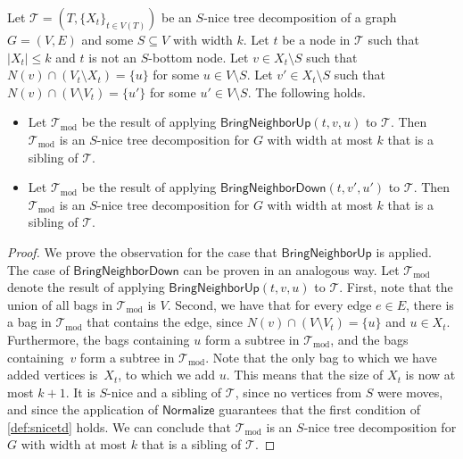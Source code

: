 \documentclass[a4paper,UKenglish,cleveref, autoref, thm-restate, numberwithinsect]{lipics-v2021}
\newcommand{\Normalize}{\mathsf{Normalize}}
\newcommand{\BringNeighborUp}{\mathsf{BringNeighborUp}}
\newcommand{\BringNeighborDown}{\mathsf{BringNeighborDown}}
\begin{document}
 \begin{observation} \label{lem:bringupdown}
     Let $\mathcal{T}=(T,\{X_t\}_{t\in V(T)})$ be an $S$-nice tree decomposition of a graph $G=(V,E)$ and some $S\subseteq V$ with width $k$. Let $t$ be a node in $\mathcal{T}$ such that $|X_t|\le k$ and $t$ is not an $S$-bottom node. Let $v\in X_t\setminus S$ such that $N(v)\cap (V_t\setminus X_t)=\{u\}$ for some $u\in V\setminus S$.
     Let $v'\in X_t\setminus S$ such that $N(v)\cap (V\setminus V_t)=\{u'\}$ for some $u'\in V\setminus S$. The following holds.
     \begin{itemize}
     \item Let $\mathcal{T}_{\text{mod}}$ be the result of applying $\BringNeighborUp(t, v, u)$ to $\mathcal{T}$. Then $\mathcal{T}_{\text{mod}}$ is an $S$-nice tree decomposition for $G$ with width at most $k$ that is a sibling of $\mathcal{T}$.
     \item Let $\mathcal{T}_{\text{mod}}$ be the result of applying $\BringNeighborDown(t, v', u')$ to $\mathcal{T}$. Then $\mathcal{T}_{\text{mod}}$ is an $S$-nice tree decomposition for $G$ with width at most $k$ that is a sibling of $\mathcal{T}$.
     \end{itemize}
 \end{observation}
 \begin{proof}
 We prove the observation for the case that $\BringNeighborUp$ is applied. The case of $\BringNeighborDown$ can be proven in an analogous way.
 Let $\mathcal{T}_{\text{mod}}$ denote the result of applying $\BringNeighborUp(t, v, u)$ to $\mathcal{T}$.
First, note that the union of all bags in $\mathcal{T}_{\text{mod}}$ is $V$. Second, we have that for every edge $e\in E$, there is a bag in $\mathcal{T}_{\text{mod}}$ that contains the edge, since $N(v)\cap (V\setminus V_{t})=\{u\}$ and $u\in X_{t}$. Furthermore, the bags containing $u$ form a subtree in $\mathcal{T}_{\text{mod}}$, and the bags containing~$v$ form a subtree in $\mathcal{T}_{\text{mod}}$.
Note that the only bag to which we have added vertices is~$X_{t}$, to which we add $u$. 
This means that the size of $X_{t}$ is now at most $k+1$.
It is $S$-nice and a sibling of $\mathcal{T}$, since no vertices from $S$ were moves, and since the application of $\Normalize$ guarantees that the first condition of \cref{def:snicetd} holds. We can conclude that $\mathcal{T}_{\text{mod}}$ is an $S$-nice tree decomposition for $G$ with width at most $k$ that is a sibling of $\mathcal{T}$.  
 \end{proof}
\end{document}
